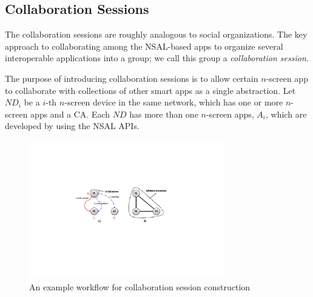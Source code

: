 \documentclass{sig-alternate}
\begin{document}
\subsection{Collaboration Sessions}
The collaboration sessions are roughly analogous to social organizations.
The key approach to collaborating among the NSAL-based apps to organize several interoperable applications into a group; we call this group a \textit{collaboration session}.

The purpose of introducing collaboration sessions is to allow certain $n$-screen app to collaborate with collections of other smart apps as a single abstraction. Let $ND_i$ be a $i$-th $n$-screen device in the same network,  which has one or more $n$-screen apps and a CA.
Each $ND$ has more than one $n$-screen apps, $A_i$, which are developed by using the NSAL APIs.
    \begin{figure}[htb] %
    \centering
    \includegraphics[width=8.5cm,keepaspectratio]{consession}
    \caption{An example workflow for collaboration session construction}
    \label{fig:constructsession}
    \end{figure}
\end{document}
